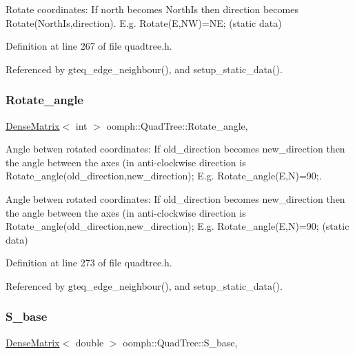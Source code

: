 Rotate coordinates\+: If north becomes North\+Is then direction becomes Rotate(\+North\+Is,direction). E.\+g. Rotate(\+E,\+N\+W)=NE; (static data) 

Definition at line 267 of file quadtree.\+h.



Referenced by gteq\+\_\+edge\+\_\+neighbour(), and setup\+\_\+static\+\_\+data().

\mbox{\label{classoomph_1_1QuadTree_afb9b79dcbde1c8e1ab6fad62688b8224}} 
\subsubsection{\texorpdfstring{Rotate\+\_\+angle}{Rotate\_angle}}
{\footnotesize\ttfamily \hyperlink{classoomph_1_1DenseMatrix}{Dense\+Matrix}$<$ int $>$ oomph\+::\+Quad\+Tree\+::\+Rotate\+\_\+angle\hspace{0.3cm}{\ttfamily [static]}, {\ttfamily [private]}}



Angle betwen rotated coordinates\+: If old\+\_\+direction becomes new\+\_\+direction then the angle between the axes (in anti-\/clockwise direction is Rotate\+\_\+angle(old\+\_\+direction,new\+\_\+direction); E.\+g. Rotate\+\_\+angle(\+E,\+N)=90;. 

Angle betwen rotated coordinates\+: If old\+\_\+direction becomes new\+\_\+direction then the angle between the axes (in anti-\/clockwise direction is Rotate\+\_\+angle(old\+\_\+direction,new\+\_\+direction); E.\+g. Rotate\+\_\+angle(\+E,\+N)=90; (static data) 

Definition at line 273 of file quadtree.\+h.



Referenced by gteq\+\_\+edge\+\_\+neighbour(), and setup\+\_\+static\+\_\+data().

\mbox{\label{classoomph_1_1QuadTree_a89acef2846ba5c3f00e424575385527e}} 
\subsubsection{\texorpdfstring{S\+\_\+base}{S\_base}}
{\footnotesize\ttfamily \hyperlink{classoomph_1_1DenseMatrix}{Dense\+Matrix}$<$ double $>$ oomph\+::\+Quad\+Tree\+::\+S\+\_\+base\hspace{0.3cm}{\ttfamily [static]}, {\ttfamily [private]}}



